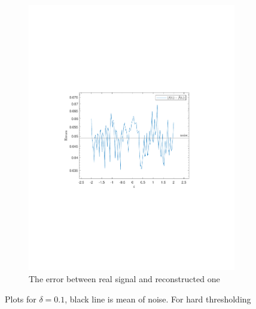 \documentclass[a4paper]{article}
\begin{document}
\begin{figure}[H]
\begin{subfigure}{0.49\textwidth}
		\includegraphics[trim={3.5cm 8cm 4cm 8cm},clip,width=1\textwidth]{Images/Delta=0.1.pdf}
		\caption{The error between real signal and reconstructed one}
		\label{sub:ErrorD=0.1}
	\end{subfigure}
	\caption{Plots for $\delta = 0.1$, black line is mean of noise. For hard thresholding}
	\label{fig:Delta=0.1}
\end{figure}
\end{document}
